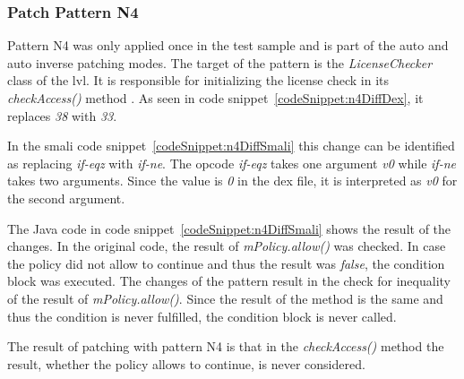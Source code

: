 \subsubsection{Patch Pattern N4}
Pattern N4 was only applied once in the test sample and is part of the auto and auto inverse patching modes.
The target of the pattern is the \textit{LicenseChecker} class of the \gls{lvl}.
It is responsible for initializing the license check in its \textit{checkAccess()} method \cite{developersLicensingReference}.
\newline
As seen in code snippet~\ref{codeSnippet:n4DiffDex}, it replaces \textit{38} with \textit{33}.
\newline

In the smali code snippet~\ref{codeSnippet:n4DiffSmali} this change can be identified as replacing \textit{if-eqz} with \textit{if-ne}.
The opcode \textit{if-eqz} takes one argument \textit{v0} while \textit{if-ne} takes two arguments.
Since the value is \textit{0} in the \gls{dex} file, it is interpreted as \textit{v0} for the second argument.
\newline

The Java code in code snippet~\ref{codeSnippet:n4DiffSmali} shows the result of the changes.
In the original code, the result of \textit{mPolicy.allow()} was checked.
In case the policy did not allow to continue and thus the result was \textit{false}, the condition block was executed.
The changes of the pattern result in the check for inequality of the result of \textit{mPolicy.allow()}.
Since the result of the method is the same and thus the condition is never fulfilled, the condition block is never called.
\newline

The result of patching with pattern N4 is that in the \textit{checkAccess()} method the result, whether the policy allows to continue, is never considered.

